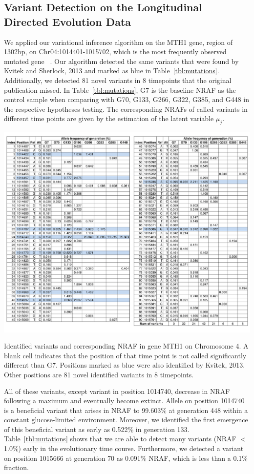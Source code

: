 \documentclass[11pt,reqno]{amsart}
\begin{document}
\subsection{Variant Detection on the Longitudinal Directed Evolution Data}
We applied our variational inference algorithm on the MTH1 gene, region of 1302bp, on Chr04:1014401-1015702, which is the most frequently observed mutated gene ~\citep{kvitek2013whole}.
Our algorithm detected the same variants that were found by Kvitek and Sherlock, 2013 and marked as blue in Table~\ref{tbl:mutations}.
Additionally, we detected 81 novel variants in 8 timepoints that the original publication missed.
In Table~\ref{tbl:mutations}, G7 is the baseline NRAF as the control sample when comparing with G70, G133, G266, G322, G385, and G448 in the respective hypotheses testing.
The corresponding NRAFs of called variants in different time points are given by the estimation of the latent variable $\mu_j$.
\begin{table}[htbp]
\centering
\includegraphics[width=1.0\textwidth]{tables/mutations_MTH1.png}
\caption{Identified variants and corresponding NRAF in gene MTH1 on Chromosome 4.
A blank cell indicates that the position of that time point is not called significantly different than G7.
Positions marked as blue were also identified by Kvitek, 2013.
Other positions are 81 novel identified variants in 8 timepoints.}
\label{tbl:mutations}
\end{table}
All of these variants, except variant in position 1014740, decrease in NRAF following a maximum and eventually become extinct.
Allele on position 1014740 is a beneficial variant that arises in NRAF to 99.603\% at generation 448 within a constant glucose-limited environment.
Moreover, we identified the first emergence of this beneficial variant as early as 0.522\% in generation 133.
Table~\ref{tbl:mutations} shows that we are able to detect many variants (NRAF $<$ 1.0\%) early in the evolutionary time course.
Furthermore, we detected a variant on position 1015666 at generation 70 as 0.091\% NRAF, which is less than a 0.1\% fraction.
\end{document}
